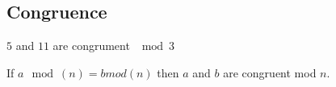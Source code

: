 
\subsection{Congruence}

\(5\) and \(11\) are congrument \(\mod 3\)

If \(a \mod(n)=b mod(n)\) then \(a\) and \(b\) are congruent mod \(n\).

